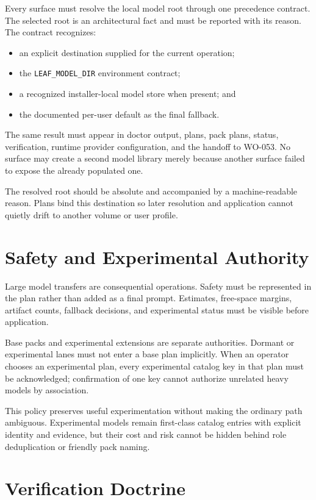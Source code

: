 \documentclass[11pt]{article}
\newcommand{\contract}[1]{\texttt{#1}}
\begin{document}
Every surface must resolve the local model root through one precedence
contract. The selected root is an architectural fact and must be reported with
its reason. The contract recognizes:

\begin{itemize}[leftmargin=*]
  \item an explicit destination supplied for the current operation;
  \item the \contract{LEAF\_MODEL\_DIR} environment contract;
  \item a recognized installer-local model store when present; and
  \item the documented per-user default as the final fallback.
\end{itemize}

The same result must appear in doctor output, plans, pack plans, status,
verification, runtime provider configuration, and the handoff to WO-053. No
surface may create a second model library merely because another surface failed
to expose the already populated one.

The resolved root should be absolute and accompanied by a machine-readable
reason. Plans bind this destination so later resolution and application cannot
quietly drift to another volume or user profile.

\section{Safety and Experimental Authority}

Large model transfers are consequential operations. Safety must be represented
in the plan rather than added as a final prompt. Estimates, free-space margins,
artifact counts, fallback decisions, and experimental status must be visible
before application.

Base packs and experimental extensions are separate authorities. Dormant or
experimental lanes must not enter a base plan implicitly. When an operator
chooses an experimental plan, every experimental catalog key in that plan must
be acknowledged; confirmation of one key cannot authorize unrelated heavy
models by association.

This policy preserves useful experimentation without making the ordinary path
ambiguous. Experimental models remain first-class catalog entries with explicit
identity and evidence, but their cost and risk cannot be hidden behind role
deduplication or friendly pack naming.

\section{Verification Doctrine}
\end{document}
